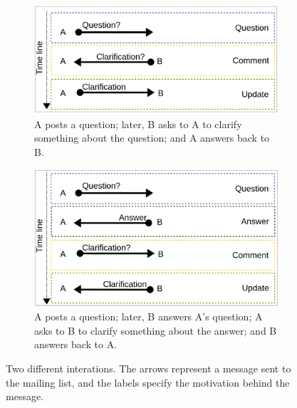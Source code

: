 \documentclass{sig-alternate-05-2015}
\begin{document}
	\begin{figure}
		\centering
	    \begin{subfigure}[b]{0.86\columnwidth}
	      \includegraphics[width=\columnwidth]{Figures/ExCommentUpdate1}
          \caption{A posts a question; later, B asks to A to clarify something about the question; and A answers back to B.}
	      \label{fig:ExCommentUpdate1-1}
        \end{subfigure}
	    \begin{subfigure}[b]{0.86\columnwidth}
	      \includegraphics[width=\columnwidth]{Figures/ExCommentUpdate2}
          \caption{A posts a question; later, B answers A's question; A asks to B to clarify something about the answer; and B answers back to A.}
      	  \label{fig:ExCommentUpdate1-2}
        \end{subfigure}

		\caption{Two different interations. The arrows represent a message sent to the mailing list, and the labels specify the motivation behind the message.}
		\label{fig:ExCommentUpdate1}
	\end{figure}
\end{document}
